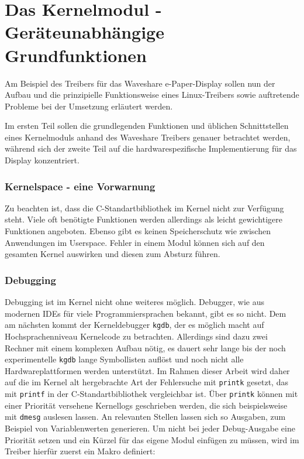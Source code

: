 
\chapter{Das Kernelmodul - Geräteunabhängige Grundfunktionen} 
Am Beispiel des Treibers für das Waveshare e-Paper-Display sollen nun der Aufbau und die prinzipielle Funktionsweise eines Linux-Treibers sowie auftretende Probleme bei der Umsetzung erläutert werden. 

Im ersten Teil sollen die grundlegenden Funktionen und üblichen Schnittstellen eines Kernelmoduls anhand des Waveshare Treibers genauer betrachtet werden, während sich der zweite Teil auf die hardwarespezifische Implementierung für das Display konzentriert.


\subsection{Kernelspace - eine Vorwarnung}
Zu beachten ist, dass die C-Standartbibliothek im Kernel nicht zur Verfügung steht. Viele oft benötigte Funktionen werden allerdings als leicht gewichtigere Funktionen angeboten. Ebenso gibt es keinen Speicherschutz wie zwischen Anwendungen im Userspace. Fehler in einem Modul können sich auf den gesamten Kernel auswirken und diesen zum Absturz führen. 

\subsection{Debugging}
Debugging ist im Kernel nicht ohne weiteres möglich. Debugger, wie aus modernen IDEs für viele Programmiersprachen bekannt, gibt es so nicht. Dem am nächsten kommt der Kerneldebugger \texttt{kgdb}, der es möglich macht auf Hochsprachenniveau Kernelcode zu betrachten. Allerdings sind dazu zwei Rechner mit einem komplexen Aufbau nötig, es dauert sehr lange bis der noch experimentelle \texttt{kgdb} lange Symbollisten auflöst und noch nicht alle Hardwareplattformen werden unterstützt. %
Im Rahmen dieser Arbeit wird daher auf die im Kernel alt hergebrachte Art der Fehlersuche mit \texttt{printk} gesetzt, das mit \texttt{printf} in der C-Standartbibliothek vergleichbar ist. Über \texttt{printk} können mit einer Priorität versehene Kernellogs geschrieben werden, die sich beispielsweise mit \texttt{dmesg} auslesen lassen. An relevanten Stellen lassen sich so Ausgaben, zum Beispiel von Variablenwerten generieren. Um nicht bei jeder Debug-Ausgabe eine Priorität setzen und ein Kürzel für das eigene Modul einfügen zu müssen, wird im Treiber hierfür zuerst ein Makro definiert:

